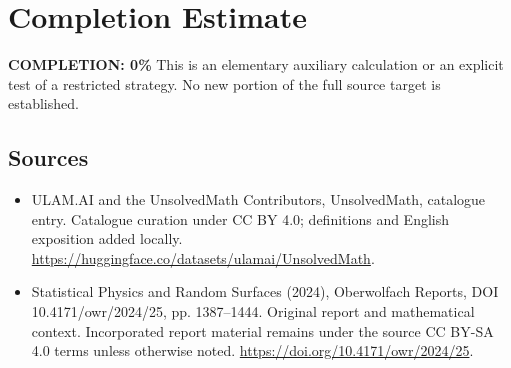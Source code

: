 \documentclass[11pt]{article}
\begin{document}
\section{Completion Estimate}
\noindent\textbf{COMPLETION: 0\%}
This is an elementary auxiliary calculation or an explicit test of a restricted strategy. No new portion of the full source target is established.

\subsection{Sources}
\begin{itemize}
\item[\hypertarget{source:statement:1}{S1}] ULAM.AI and the UnsolvedMath Contributors, UnsolvedMath, catalogue entry. Catalogue curation under CC BY 4.0; definitions and English exposition added locally.
\url{https://huggingface.co/datasets/ulamai/UnsolvedMath}.
\item[\hypertarget{source:statement:2}{S2}] Statistical Physics and Random Surfaces (2024), Oberwolfach Reports, DOI 10.4171/owr/2024/25, pp. 1387--1444. Original report and mathematical context. Incorporated report material remains under the source CC BY-SA 4.0 terms unless otherwise noted.
\url{https://doi.org/10.4171/owr/2024/25}.
\end{itemize}
\label{end:statement}
\end{document}
